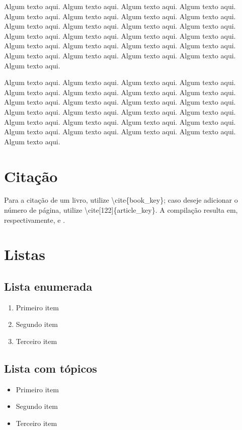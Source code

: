 Algum texto aqui. Algum texto aqui. Algum texto aqui. Algum texto aqui. Algum texto aqui. Algum texto aqui. Algum texto aqui. Algum texto aqui. Algum texto aqui. Algum texto aqui. Algum texto aqui. Algum texto aqui. Algum texto aqui. Algum texto aqui. Algum texto aqui. Algum texto aqui. Algum texto aqui. Algum texto aqui. Algum texto aqui. Algum texto aqui. Algum texto aqui. Algum texto aqui. Algum texto aqui. Algum texto aqui. Algum texto aqui.

Algum texto aqui. Algum texto aqui. Algum texto aqui. Algum texto aqui. Algum texto aqui. Algum texto aqui. Algum texto aqui. Algum texto aqui. Algum texto aqui. Algum texto aqui. Algum texto aqui. Algum texto aqui. Algum texto aqui. Algum texto aqui. Algum texto aqui. Algum texto aqui. Algum texto aqui. Algum texto aqui. Algum texto aqui. Algum texto aqui. Algum texto aqui. Algum texto aqui. Algum texto aqui. Algum texto aqui. Algum texto aqui. 

\section{Citação}

Para a citação de um livro, utilize \textbackslash cite\{book\_key\}; caso deseje adicionar o número de página, utilize \textbackslash cite[122]\{article\_key\}. A compilação resulta em, respectivamente, \cite{book_key} e \cite[122]{article_key}.

\section{Listas}

\subsection{Lista enumerada}

\begin{enumerate}
\item Primeiro item
\item Segundo item
\item Terceiro item
\end{enumerate}

\subsection{Lista com tópicos}

\begin{itemize}
\item Primeiro item
\item Segundo item
\item Terceiro item
\end{itemize}

